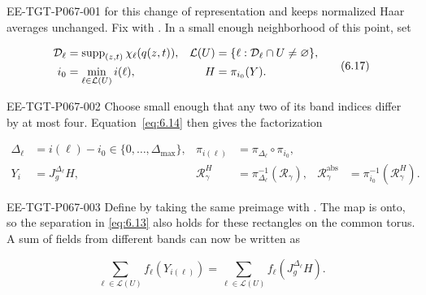 %
\begin{EESegment}{EE-TGT-P067-001}
for this change of representation and keeps normalized Haar averages unchanged. Fix  with . In a small enough neighborhood  of this point, set
\end{EESegment}
\begin{equation}
  \begin{aligned}
    \mathcal D_\ell&=\operatorname{supp}_{(z,t)}\chi_\ell(q(z,t)),
      & \mathcal L(U)&=\{\ell:\mathcal D_\ell\cap U\ne\varnothing\},\\
    i_0&=\min_{\ell\in\mathcal L(U)}i(\ell),
      & H&=\pi_{i_0}(Y).
  \end{aligned}
  \tag{6.17}\label{eq:6.17}
\end{equation}
\begin{EESegment}{EE-TGT-P067-002}
Choose  small enough that any two of its band indices differ by at most four. Equation~\eqref{eq:6.14} then gives the factorization
\end{EESegment}
\begin{equation}
  \begin{aligned}
    \Delta_\ell&=i(\ell)-i_0\in\{0,\ldots,\Delta_{\max}\},
      & \pi_{i(\ell)}&=\pi_{\Delta_\ell}\circ\pi_{i_0},\\
    Y_i&=J_g^{\Delta_\ell}H,
      & \mathcal R_\gamma^H&=\pi_{\Delta_\ell}^{-1}(\mathcal R_\gamma),
      & \mathcal R_\gamma^{\mathrm{abs}}
        &=\pi_{i_0}^{-1}(\mathcal R_\gamma^H).
  \end{aligned}
  \tag{6.18}\label{eq:6.18}
\end{equation}
\begin{EESegment}{EE-TGT-P067-003}
Define  by taking the same preimage with . The map  is onto, so the separation in \eqref{eq:6.13} also holds for these rectangles on the common torus. A sum of fields from different bands can now be written as
\end{EESegment}
\[
  \sum_{\ell\in\mathcal L(U)}f_\ell(Y_{i(\ell)})
  =\sum_{\ell\in\mathcal L(U)}f_\ell(J_g^{\Delta_\ell}H).
\]

